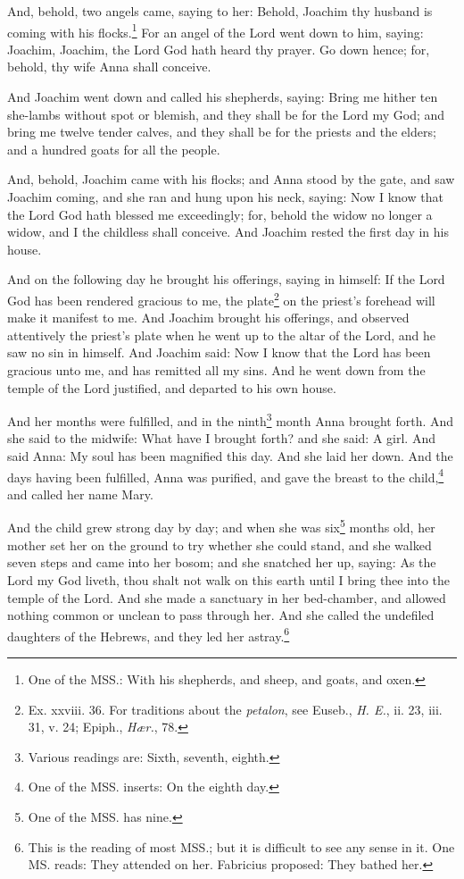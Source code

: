 \pend\pstart
And, behold, two angels came, saying to her: Behold, Joachim thy husband is coming with his
flocks.\footnote{One of the MSS.: With his shepherds, and sheep, and goats, and oxen.} For an angel of the Lord went down to him, saying: Joachim, Joachim, the Lord God hath heard thy prayer. Go down hence; for, behold, thy wife Anna shall conceive.

\pend\pstart
And Joachim went down and called his shepherds, saying: Bring me hither ten she-lambs without spot or blemish, and they shall be for the Lord my God; and bring me twelve tender calves, and they shall be for the priests and the elders; and a hundred goats for all the people.

\pend\pstart
And, behold, Joachim came with his flocks; and Anna stood by the gate, and saw Joachim coming, and she ran and hung upon his neck, saying: Now I know that the Lord God hath blessed me exceedingly; for, behold the widow no longer a widow, and I the childless shall conceive. And Joachim rested the first day in his house.

\pend\pstart
{}

\pend\setcounter{pstartR}{1}\pstart
And on the following day he brought his offerings, saying in himself: If the Lord God has been rendered gracious to me, the plate\footnote{Ex. xxviii. 36. For traditions about the \textit{petalon}, see Euseb., \textit{H. E.}, ii. 23, iii. 31, v. 24; Epiph., \textit{Hær.}, 78.} on the priest's forehead will make it manifest to me. And Joachim brought his offerings, and observed attentively the priest's plate when he went up to the altar of the Lord, and he saw no sin in himself. And Joachim said: Now I know that the Lord has been gracious unto me, and has remitted all my sins. And he went down from the temple of the Lord justified, and departed to his own house.

\pend\pstart
And her months were fulfilled, and in the ninth\footnote{Various readings are: Sixth, seventh, eighth.} month Anna brought forth. And she said to the midwife: What have I brought forth? and she said: A girl. And said Anna: My soul has been magnified this day. And she laid her down. And the days having been fulfilled, Anna was purified, and gave the breast to the child,\footnote{One of the MSS. inserts: On the eighth day.} and called her name Mary.

\pend\pstart
{}

\pend\setcounter{pstartR}{1}\pstart
And the child grew strong day by day; and when she was six\footnote{One of the MSS. has nine.} months old, her mother set her on the ground to try whether she could stand, and she walked seven steps and came into her bosom; and she snatched her up, saying: As the Lord my God liveth, thou shalt not walk on this earth until I bring thee into the temple of the Lord. And she made a sanctuary in her bed-chamber, and allowed nothing common or unclean to pass through her. And she called the undefiled daughters of the Hebrews, and they led her astray.\footnote{This is the reading of most MSS.; but it is difficult to see any sense in it. One MS. reads: They attended on her. Fabricius proposed: They bathed her.}

